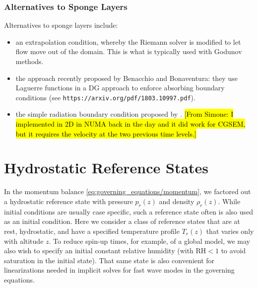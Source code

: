 \documentclass{report}
\begin{document}
\subsection{Alternatives to Sponge Layers}

Alternatives to sponge layers include:
 \begin{itemize}
    \item an extrapolation condition, whereby the Riemann solver is modified to let flow move out of the domain. This is what is typically used with Godunov methods. 
    \item the approach recently proposed by Benacchio and Bonaventura: they use Laguerre functions in a DG approach to enforce absorbing boundary conditions (see \texttt{https://arxiv.org/pdf/1803.10997.pdf}).
    \item the simple radiation boundary condition proposed by \cite{orlanski1979}. \hl{[From Simone: I implemented in 2D in NUMA back in the day and it did work for CGSEM, but it requires the velocity at the two previous time levels.]}
\end{itemize}
    
    
\chapter{Hydrostatic Reference States}\label{c:reference_state}

In the momentum balance \eqref{eq:governing_equations/momentum}, we factored out a hydrostatic reference state with pressure $p_r(z)$ and density $\rho_r(z)$. While initial conditions are usually case specific, such a reference state often is also used as an initial condition. Here we consider a class of reference states that are at rest, hydrostatic, and have a specified temperature profile $T_r(z)$ that varies only with altitude $z$. To reduce spin-up times, for example, of a global model, we may also wish to specify an initial constant relative humidity (with $\mathrm{RH} < 1$ to avoid saturation in the initial state). That same state is also convenient for linearizations needed in implicit solves for fast wave modes in the governing equations.
\end{document}
